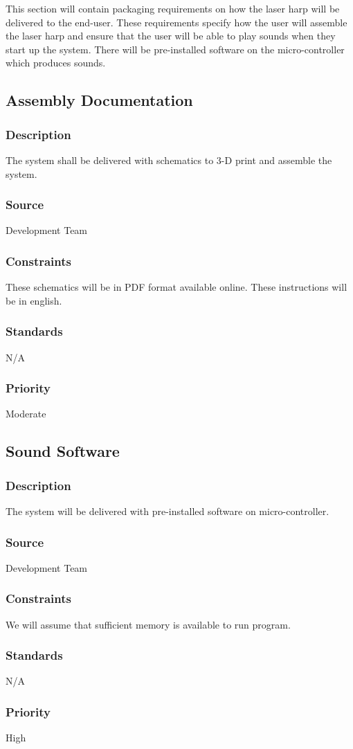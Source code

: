 This section will contain packaging requirements on how the laser harp will be delivered to the end-user. These requirements specify how the user will assemble the laser harp and ensure that the user will be able to play sounds when they start up the system. There will be pre-installed software on the micro-controller which produces sounds.

\subsection{Assembly Documentation}
\subsubsection{Description}
The system shall be delivered with schematics to 3-D print and assemble the system.
\subsubsection{Source}
Development Team
\subsubsection{Constraints}
These schematics will be in PDF format available online. These instructions will be in english.
\subsubsection{Standards}
N/A
\subsubsection{Priority}
Moderate

\subsection{Sound Software}
\subsubsection{Description}
The system will be delivered with pre-installed software on micro-controller.
\subsubsection{Source}
Development Team
\subsubsection{Constraints}
We will assume that sufficient memory is available to run program.
\subsubsection{Standards}
N/A
\subsubsection{Priority}
High